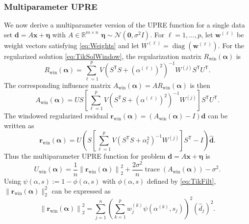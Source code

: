 \documentclass[12pt]{article}
\newcommand{\dVec}{\mathbf{d}}	%
\newcommand{\rVec}{\mathbf{r}}	%
\newcommand{\xVec}{\mathbf{x}}	%
\newcommand{\wVec}{\mathbf{w}}	%
\newcommand{\trans}[1]{{#1}^\mathsf{T}}	%
\newcommand{\inv}[1]{{#1}^{-1}}	%
\DeclareMathOperator{\trace}{trace}		%
\DeclareMathOperator{\diag}{diag}	%
\newcommand{\dft}[1]{\widehat{#1}}	%
\newcommand{\regparam}{\alpha}  %
\newcommand{\regparamVec}{\bm{\regparam}}   %
\newcommand{\filt}{\phi}
\newcommand{\mfilt}{\psi}
\newcommand{\noise}{\eta}	%
\newcommand{\noiseSD}{\sigma}	%
\newcommand{\noiseVec}{\bm{\noise}}	%
\newcommand{\zeroVec}{\bm{0}}	%
\newcommand{\singular}{s}	%
\begin{document}
\subsubsection{Multiparameter UPRE}
We now derive a multiparameter version of the UPRE function for a single data set $\dVec = A\xVec + \noiseVec$ with $A \in \mathbb{R}^{m \times n}$ $\noiseVec \sim \mathcal{N}(\zeroVec,\noiseSD^2 I)$. For $\ell = 1,\ldots,p$, let $\wVec^{(\ell)}$ be weight vectors satisfying \eqref{eq:Weights} and let $W^{(\ell)} = \diag(\wVec^{(\ell)})$. For the regularized solution \eqref{eq:TikSolWindow}, the regularization matrix $R_\text{win}(\regparamVec)$ is
\begin{equation}
\label{eq:Windowed Reg Matrix}
    R_\text{win}(\regparamVec) = \sum_{\ell=1}^p V\inv{\left(\trans{S}S + \left(\regparam^{(\ell)}\right)^2\right)}W^{(j)}\trans{S}\trans{U}.
\end{equation}
The corresponding influence matrix $A_\text{win}(\regparamVec) = AR_\text{win}(\regparamVec)$ is then
\begin{equation}
\label{eq:Windowed Influence Matrix}
    A_\text{win}(\regparamVec) = US\left[\sum_{\ell=1}^p V\inv{\left(\trans{S}S + \left(\regparam^{(\ell)}\right)^2\right)}W^{(j)}\right]\trans{S}\trans{U}. 
\end{equation}
The windowed regularized residual $\rVec_\text{win}(\regparamVec) = (A_\text{win}(\regparamVec) - I)\dVec$ can be written as
\begin{equation}
    \rVec_\text{win}(\regparamVec) = U\left(S\left[\sum_{\ell=1}^p V\inv{\left(\trans{S}S + \regparam_{\ell}^2\right)}W^{(j)}\right]\trans{S}-I\right)\dft{\dVec}.
\end{equation}
Thus the multiparameter UPRE function for problem $\dVec = A\xVec + \noiseVec$ is 
\begin{equation}
\label{eq:Multiparameter UPRE}
    U_\text{win}(\regparamVec) = \frac{1}{n}\left\|\rVec_\text{win}(\regparamVec)\right\|_2^2 + \frac{2\noiseSD^2}{n}\trace\left(A_\text{win}(\regparamVec)\right) - \noiseSD^2.
\end{equation}
Using $\mfilt(\regparam,\singular) := 1 - \filt(\regparam,\singular)$ with $\filt(\regparam,\singular)$ defined by \eqref{eq:TikFilt}, $\|\rVec_\text{win}(\regparamVec)\|_2^2$ can be expressed as
\begin{equation}
\label{eq:Windowed Regularized Residual}
    \left\|\rVec_\text{win}(\regparamVec)\right\|_2^2 = \sum_{j=1}^{n} \left(\sum_{k=1}^{p} w_j^{(k)} \mfilt\left(\regparam^{(k)},\singular_j\right) \right)^2 \left(\dft{d}_j\right)^2.
\end{equation}
\end{document}
